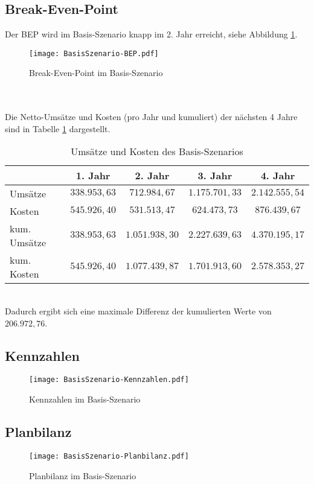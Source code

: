 \subsection{Break-Even-Point}
\label{sec:BasisSzenario-BEP}
Der BEP wird im Basis-Szenario knapp im 2. Jahr erreicht, siehe Abbildung \ref{fig:BasisSzenario-BEP}.
\begin{figure}[h]
	\centering
	\texttt{[image: BasisSzenario-BEP.pdf]}
	\caption{Break-Even-Point im Basis-Szenario}
	\label{fig:BasisSzenario-BEP}
\end{figure}\\
\\Die Netto-Umsätze und Kosten (pro Jahr und kumuliert) der nächsten 4 Jahre sind in Tabelle \ref{tab:BasisSzenario-BEP} dargestellt.
\begin{table}[h]
	\centering
	\begin{tabular}{|l|c|c|c|c|}
		\hline 
		& 1. Jahr & 2. Jahr & 3. Jahr & 4. Jahr \\ 
		\hline 
		Umsätze & $338.953,63$\officialeuro & $712.984,67$\officialeuro & $1.175.701,33$\officialeuro & $2.142.555,54$\officialeuro \\
		\hline 
		Kosten & $545.926,40$\officialeuro & $531.513,47$\officialeuro & $624.473,73$\officialeuro & $876.439,67$\officialeuro \\		
		\hline 
		kum. Umsätze & $338.953,63$\officialeuro & $1.051.938,30$\officialeuro & $2.227.639,63$\officialeuro & $4.370.195,17$\officialeuro \\		
		\hline 
		kum. Kosten & $545.926,40$\officialeuro & $1.077.439,87$\officialeuro & $1.701.913,60$\officialeuro & $2.578.353,27$\officialeuro \\		
		\hline 
	\end{tabular}
	\caption{Umsätze und Kosten des Basis-Szenarios}
	\label{tab:BasisSzenario-BEP} 
\end{table}\\
Dadurch ergibt sich eine maximale Differenz der kumulierten Werte von $206.972,76$\officialeuro.

\newpage
\subsection{Kennzahlen}
\begin{figure}[h]
	\centering
	\texttt{[image: BasisSzenario-Kennzahlen.pdf]}
	\caption{Kennzahlen im Basis-Szenario}
	\label{fig:BasisSzenario-Kennzahlen}
\end{figure}
\newpage
\subsection{Planbilanz}
\begin{figure}[h]
	\centering
	\texttt{[image: BasisSzenario-Planbilanz.pdf]}
	\caption{Planbilanz im Basis-Szenario}
	\label{fig:BasisSzenario-Planbilanz}
\end{figure}

